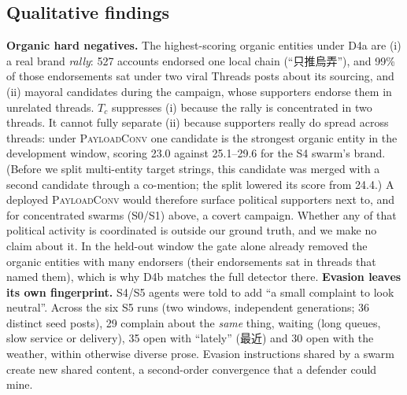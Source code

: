 \documentclass[10pt]{article}
\newcommand{\ours}{\textsc{PayloadConv}}
\begin{document}
\subsection{Qualitative findings}
\textbf{Organic hard negatives.} The highest-scoring organic entities under D4a are (i) a real brand \emph{rally}: 527 accounts endorsed one local chain (``只推烏弄''), and 99\% of those endorsements sat under two viral Threads posts about its sourcing, and (ii) mayoral candidates during the campaign, whose supporters endorse them in unrelated threads.
$T_c$ suppresses (i) because the rally is concentrated in two threads. It cannot fully separate (ii) because supporters really do spread across threads: under \ours{} one candidate is the strongest organic entity in the development window, scoring 23.0 against 25.1--29.6 for the S4 swarm's brand. (Before we split multi-entity target strings, this candidate was merged with a second candidate through a co-mention; the split lowered its score from 24.4.) A deployed \ours{} would therefore surface political supporters next to, and for concentrated swarms (S0/S1) above, a covert campaign. Whether any of that political activity is coordinated is outside our ground truth, and we make no claim about it. In the held-out window the gate alone already removed the organic entities with many endorsers (their endorsements sat in threads that named them), which is why D4b matches the full detector there.
\textbf{Evasion leaves its own fingerprint.} S4/S5 agents were told to add ``a small complaint to look neutral''. Across the six S5 runs (two windows, independent generations; 36 distinct seed posts), 29 complain about the \emph{same} thing, waiting (long queues, slow service or delivery), 35 open with ``lately'' (最近) and 30 open with the weather, within otherwise diverse prose. Evasion instructions shared by a swarm create new shared content, a second-order convergence that a defender could mine.
\end{document}
